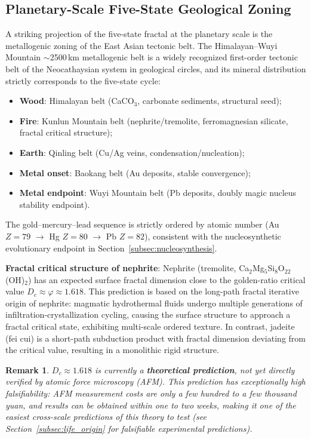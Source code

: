 \documentclass[12pt,a4paper,twocolumn]{article}
\renewcommand{\phi}{\varphi}
\newtheorem{remark}[theorem]{Remark}
\begin{document}
\subsection{Planetary-Scale Five-State Geological Zoning}
\label{subsec:geological}

A striking projection of the five-state fractal at the planetary scale is the metallogenic zoning of the East Asian tectonic belt. The Himalayan--Wuyi Mountain $\sim$2500\,km metallogenic belt is a widely recognized first-order tectonic belt of the Neocathaysian system in geological circles, and its mineral distribution strictly corresponds to the five-state cycle:

\begin{itemize}
\item \textbf{Wood}: Himalayan belt (CaCO$_3$, carbonate sediments, structural seed);
\item \textbf{Fire}: Kunlun Mountain belt (nephrite/tremolite, ferromagnesian silicate, fractal critical structure);
\item \textbf{Earth}: Qinling belt (Cu/Ag veins, condensation/nucleation);
\item \textbf{Metal onset}: Baokang belt (Au deposits, stable convergence);
\item \textbf{Metal endpoint}: Wuyi Mountain belt (Pb deposits, doubly magic nucleus stability endpoint).
\end{itemize}

The gold--mercury--lead sequence is strictly ordered by atomic number (Au $Z=79$ $\to$ Hg $Z=80$ $\to$ Pb $Z=82$), consistent with the nucleosynthetic evolutionary endpoint in Section~\ref{subsec:nucleosynthesis}.

\textbf{Fractal critical structure of nephrite}: Nephrite (tremolite, Ca$_2$Mg$_5$Si$_8$O$_{22}$(OH)$_2$) has an expected surface fractal dimension close to the golden-ratio critical value $D_c \approx \phi \approx 1.618$. This prediction is based on the long-path fractal iterative origin of nephrite: magmatic hydrothermal fluids undergo multiple generations of infiltration-crystallization cycling, causing the surface structure to approach a fractal critical state, exhibiting multi-scale ordered texture. In contrast, jadeite (fei cui) is a short-path subduction product with fractal dimension deviating from the critical value, resulting in a monolithic rigid structure.

\begin{remark}
$D_c \approx 1.618$ is currently a \textbf{theoretical prediction}, not yet directly verified by atomic force microscopy (AFM). This prediction has exceptionally high falsifiability: AFM measurement costs are only a few hundred to a few thousand yuan, and results can be obtained within one to two weeks, making it one of the easiest cross-scale predictions of this theory to test (see Section~\ref{subsec:life_origin} for falsifiable experimental predictions).
\end{remark}
\end{document}
